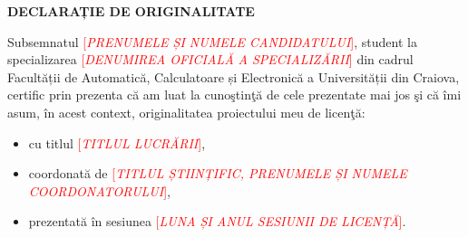 \newpage
\begin{center}
    \fontsize{12}{11}\selectfont
    \textbf{DECLARAȚIE DE ORIGINALITATE}
    \\[4\baselineskip]
    \end{center}
    
    \renewcommand{\baselinestretch}{1.8}
    \raggedright
        \fontsize{11}{11}\selectfont
    Subsemnatul \textcolor{red}{[\textit{PRENUMELE ȘI NUMELE CANDIDATULUI}]}, student la specializarea \textcolor{red}{[\textit{DENUMIREA OFICIALĂ 
    A SPECIALIZĂRII}]} din cadrul Facultății de Automatică, Calculatoare și Electronică a Universității din Craiova, certific prin 
    prezenta că am luat la cunoştinţă de cele prezentate mai jos şi că îmi asum, în acest context, originalitatea 
    proiectului meu de licenţă: 
        \begin{itemize}
            \setlength\itemsep{-0.5em}
            \item cu titlul \textcolor{red}{[\textit{TITLUL LUCRĂRII}]}, 
            \item coordonată de \textcolor{red}{[\textit{TITLUL ȘTIINȚIFIC, PRENUMELE ȘI NUMELE COORDONATORULUI}]}, 
            \item prezentată în sesiunea \textcolor{red}{[\textit{LUNA ȘI ANUL SESIUNII DE LICENȚĂ}]}.
        \end{itemize}
    
